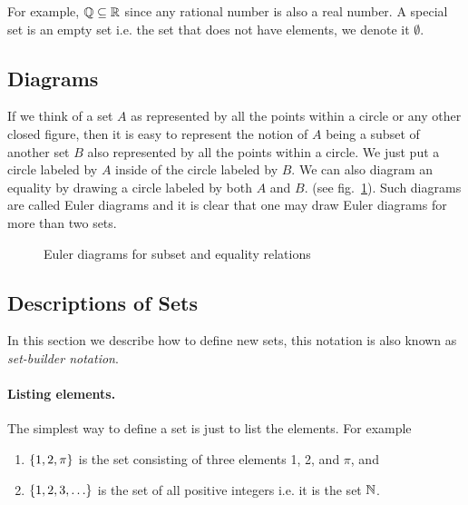 For example, $\mathbb{Q} \subseteq \mathbb{R}$ since any rational number is
also a real number. A special set is an empty set i.e. the set that does not
have elements, we denote it $\emptyset$.



\subsection{Diagrams}
If we think of a set $A$ as represented by all the points within a circle or
any other closed figure, then it is easy to represent the notion of $A$ being a
subset of another set $B$ also represented by all the points within a circle.
We just put a circle labeled by $A$ inside of the circle labeled by $B$. We can
also diagram an equality by drawing a circle labeled by both $A$ and $B$. (see
fig.~\ref{figure:euler-diagram}). Such diagrams are called Euler diagrams and
it is clear that one may draw Euler diagrams for more than two sets.

\begin{figure}
    \centering
    \qquad\qquad
    \caption{Euler diagrams for subset and equality relations}
    \label{figure:euler-diagram}
\end{figure}


\subsection{Descriptions of Sets}
In this section we describe how to define new sets, this notation is also
known as \textit{set-builder notation}.

\paragraph{Listing elements.} The simplest way to define a set is just to list
the elements. For example
\begin{enumerate}
  \item $\set{1, 2, \pi}$ is the set consisting of three elements 1, 2, and
    $\pi$, and
  \item $\set{1, 2, 3, \dots}$ is the set of all positive integers i.e. it is
    the set $\mathbb{N}$.
\end{enumerate}

